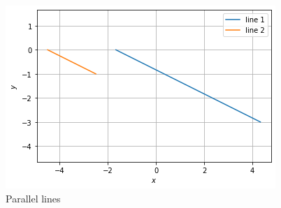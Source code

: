 \begin{enumerate}
%
\begin{figure}[ht]
    \centering
   \includegraphics[width=\columnwidth]{solutions/su2021/2/6/FIGURES/PARALLEL_LINES.png}
    \caption{Parallel lines}
    \label{line/6/fig: PARALLEL lines.}
\end{figure}    
\end{enumerate}
